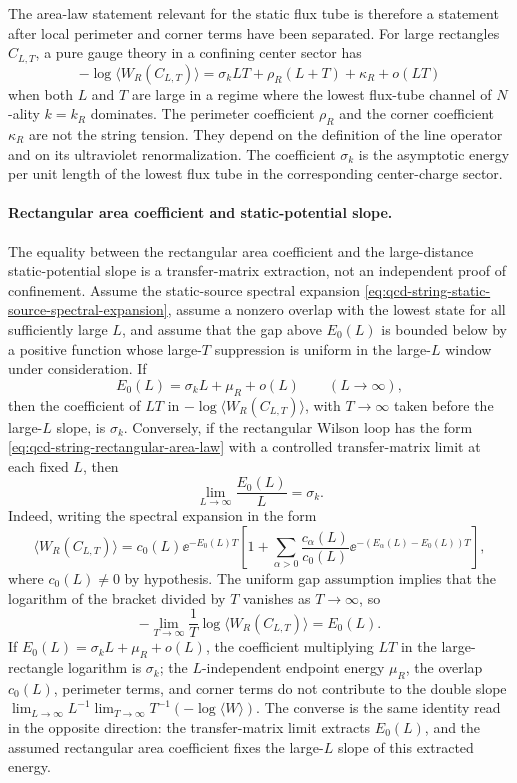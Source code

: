 The area-law statement relevant for the static flux tube is therefore a
statement after local perimeter and corner terms have been separated.  For
large rectangles \(C_{L,T}\), a pure gauge theory in a confining center sector
has
\begin{equation}
  -\log \langle W_R(C_{L,T})\rangle
  =
  \sigma_k LT+\rho_R(L+T)+\kappa_R
  +o(LT)
  \label{eq:qcd-string-rectangular-area-law}
\end{equation}
when both \(L\) and \(T\) are large in a regime where the lowest flux-tube
channel of \(N\)-ality \(k=k_R\) dominates.  The perimeter coefficient
\(\rho_R\) and the corner coefficient \(\kappa_R\) are not the string tension.
They depend on the definition of the line operator and on its ultraviolet
renormalization.  The coefficient \(\sigma_k\) is the asymptotic energy per
unit length of the lowest flux tube in the corresponding center-charge sector.

\paragraph{Rectangular area coefficient and static-potential slope.}
The equality between the rectangular area coefficient and the large-distance
static-potential slope is a transfer-matrix extraction, not an independent
proof of confinement.  Assume the static-source spectral expansion
\eqref{eq:qcd-string-static-source-spectral-expansion}, assume a nonzero
overlap with the lowest state for all sufficiently large \(L\), and assume
that the gap above \(E_0(L)\) is bounded below by a positive function whose
large-\(T\) suppression is uniform in the large-\(L\) window under
consideration.  If
\[
  E_0(L)=\sigma_k L+\mu_R+o(L)
  \qquad (L\to\infty),
\]
then the coefficient of \(LT\) in
\(-\log\langle W_R(C_{L,T})\rangle\), with \(T\to\infty\) taken before the
large-\(L\) slope, is \(\sigma_k\).  Conversely, if the rectangular Wilson
loop has the form \eqref{eq:qcd-string-rectangular-area-law} with a
controlled transfer-matrix limit at each fixed \(L\), then
\[
  \lim_{L\to\infty}\frac{E_0(L)}{L}=\sigma_k .
\]
Indeed, writing the spectral expansion in the form
\[
  \langle W_R(C_{L,T})\rangle
  =
  c_0(L)\ee^{-E_0(L)T}
  \left[
    1+
    \sum_{\alpha>0}\frac{c_\alpha(L)}{c_0(L)}
    \ee^{-(E_\alpha(L)-E_0(L))T}
  \right],
\]
where \(c_0(L)\ne0\) by hypothesis.  The uniform gap assumption implies that
the logarithm of the bracket divided by \(T\) vanishes as \(T\to\infty\), so
\[
  -\lim_{T\to\infty}\frac1T
  \log \langle W_R(C_{L,T})\rangle
  =
  E_0(L).
\]
If \(E_0(L)=\sigma_kL+\mu_R+o(L)\), the coefficient multiplying \(LT\) in the
large-rectangle logarithm is \(\sigma_k\); the \(L\)-independent endpoint
energy \(\mu_R\), the overlap \(c_0(L)\), perimeter terms, and corner terms
do not contribute to the double slope
\(\lim_{L\to\infty}L^{-1}\lim_{T\to\infty}T^{-1}(-\log\langle W\rangle)\).
The converse is the same identity read in the opposite direction: the
transfer-matrix limit extracts \(E_0(L)\), and the assumed rectangular area
coefficient fixes the large-\(L\) slope of this extracted energy.

